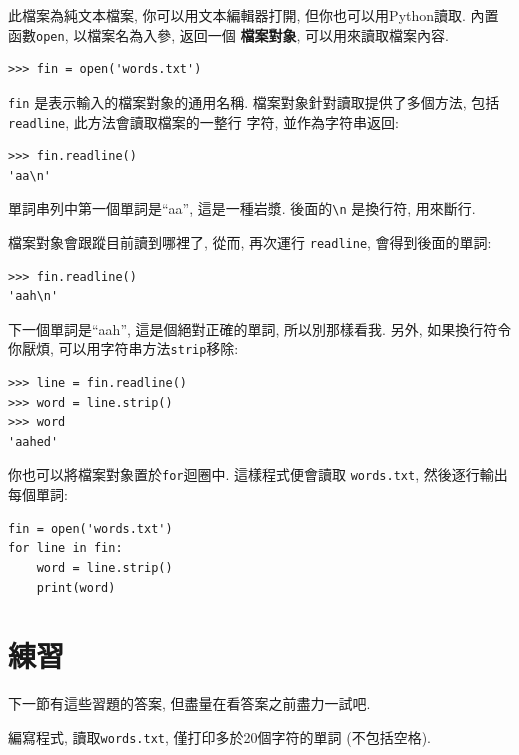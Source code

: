 \documentclass[10pt]{book}
\begin{document}
此檔案為純文本檔案, 你可以用文本編輯器打開, 
但你也可以用Python讀取. 
內置函數{\tt open}, 以檔案名為入參, 返回一個 {\bf 檔案對象}, 
可以用來讀取檔案內容. 

\begin{verbatim}
>>> fin = open('words.txt')
\end{verbatim}
%
{\tt fin} 是表示輸入的檔案對象的通用名稱. 
檔案對象針對讀取提供了多個方法, 包括 {\tt readline}, 此方法會讀取檔案的一整行
字符, 並作為字符串返回: 

\begin{verbatim}
>>> fin.readline()
'aa\n'
\end{verbatim}
%
單詞串列中第一個單詞是``aa'', 這是一種岩漿. 
後面的\verb"\n" 是換行符, 用來斷行. 

檔案對象會跟蹤目前讀到哪裡了, 從而, 再次運行
{\tt readline}, 會得到後面的單詞:

\begin{verbatim}
>>> fin.readline()
'aah\n'
\end{verbatim}
%
下一個單詞是``aah'',  這是個絕對正確的單詞, 所以別那樣看我. 
另外, 如果換行符令你厭煩, 可以用字符串方法{\tt strip}移除:

\begin{verbatim}
>>> line = fin.readline()
>>> word = line.strip()
>>> word
'aahed'
\end{verbatim}
%
你也可以將檔案對象置於{\tt for}迴圈中. 
這樣程式便會讀取 {\tt words.txt}, 然後逐行輸出每個單詞:

\begin{verbatim}
fin = open('words.txt')
for line in fin:
    word = line.strip()
    print(word)
\end{verbatim}
%

\section{練習}
下一節有這些習題的答案, 但盡量在看答案之前盡力一試吧. 

\begin{exercise}
編寫程式, 讀取{\tt words.txt}, 僅打印多於20個字符的單詞
(不包括空格). 

\end{exercise}
\end{document}
